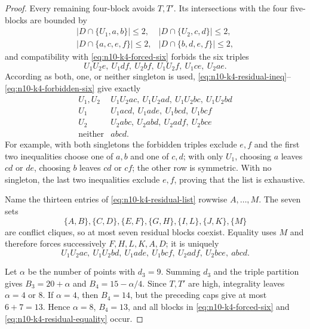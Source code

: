 \begin{proof}
Every remaining four-block avoids $T,T'$.  Its intersections with the four
five-blocks are bounded by
\begin{equation}\label{eq:n10-k4-residual-ineq}
 \begin{array}{ll}
 |D\cap\{U_1,a,b\}|\le2,&|D\cap\{U_2,c,d\}|\le2,\\
 |D\cap\{a,c,e,f\}|\le2,&|D\cap\{b,d,e,f\}|\le2,
 \end{array}
\end{equation}
and compatibility with \eqref{eq:n10-k4-forced-six} forbids the six triples
\begin{equation}\label{eq:n10-k4-forbidden-six}
 U_1U_2e,\ U_1df,\ U_2bf,\ U_1U_2f,\ U_1ce,\ U_2ae.
\end{equation}
According as both, one, or neither singleton is used,
\eqref{eq:n10-k4-residual-ineq}--\eqref{eq:n10-k4-forbidden-six} give
exactly
\begin{equation}\label{eq:n10-k4-residual-list}
\begin{array}{c|l}
U_1,U_2&U_1U_2ac,\ U_1U_2ad,\ U_1U_2bc,\ U_1U_2bd\\
U_1&U_1acd,\ U_1ade,\ U_1bcd,\ U_1bcf\\
U_2&U_2abc,\ U_2abd,\ U_2adf,\ U_2bce\\
\text{neither}&abcd.
\end{array}
\end{equation}
For example, with both singletons the forbidden triples exclude $e,f$ and
the first two inequalities choose one of $a,b$ and one of $c,d$; with only
$U_1$, choosing $a$ leaves $cd$ or $de$, choosing $b$ leaves $cd$ or $cf$;
the other row is symmetric.  With no singleton, the last two inequalities
exclude $e,f$, proving that the list is exhaustive.

Name the thirteen entries of \eqref{eq:n10-k4-residual-list} rowwise
$A,\ldots,M$.  The seven sets
\begin{equation}\label{eq:n10-k4-clique-cover}
 \{A,B\},\{C,D\},\{E,F\},\{G,H\},
 \{I,L\},\{J,K\},\{M\}
\end{equation}
are conflict cliques, so at most seven residual blocks coexist.  Equality
uses $M$ and therefore forces successively $F,H,L,K,A,D$; it is uniquely
\begin{equation}\label{eq:n10-k4-residual-equality}
 U_1U_2ac,\ U_1U_2bd,\ U_1ade,\ U_1bcf,
 \ U_2adf,\ U_2bce,\ abcd.
\end{equation}

Let $\alpha$ be the number of points with $d_3=9$.  Summing $d_3$ and the
triple partition gives $B_3=20+\alpha$ and
$B_4=15-\alpha/4$.  Since $T,T'$ are high, integrality leaves
$\alpha=4$ or $8$.  If $\alpha=4$, then $B_4=14$, but the preceding caps
give at most $6+7=13$.  Hence $\alpha=8$, $B_4=13$, and all blocks in
\eqref{eq:n10-k4-forced-six} and
\eqref{eq:n10-k4-residual-equality} occur.


\end{proof}
